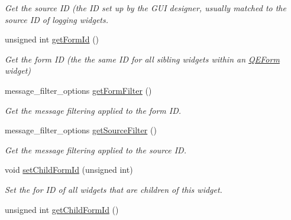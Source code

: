 \begin{DoxyCompactItemize}
\begin{DoxyCompactList}\small\item\em Get the source ID (the ID set up by the GUI designer, usually matched to the source ID of logging widgets. \end{DoxyCompactList}\item 
\hypertarget{classUserMessage_a086c3d5af3d5b442684a0a099b9f1126}{
unsigned int \hyperlink{classUserMessage_a086c3d5af3d5b442684a0a099b9f1126}{getFormId} ()}
\label{classUserMessage_a086c3d5af3d5b442684a0a099b9f1126}

\begin{DoxyCompactList}\small\item\em Get the form ID (the the same ID for all sibling widgets within an \hyperlink{classQEForm}{QEForm} widget) \end{DoxyCompactList}\item 
\hypertarget{classUserMessage_a342c763a4cb31a8f5d9597655b25f7a3}{
message\_\-filter\_\-options \hyperlink{classUserMessage_a342c763a4cb31a8f5d9597655b25f7a3}{getFormFilter} ()}
\label{classUserMessage_a342c763a4cb31a8f5d9597655b25f7a3}

\begin{DoxyCompactList}\small\item\em Get the message filtering applied to the form ID. \end{DoxyCompactList}\item 
\hypertarget{classUserMessage_a51393a98df511d7ad6ca594ce95ceec9}{
message\_\-filter\_\-options \hyperlink{classUserMessage_a51393a98df511d7ad6ca594ce95ceec9}{getSourceFilter} ()}
\label{classUserMessage_a51393a98df511d7ad6ca594ce95ceec9}

\begin{DoxyCompactList}\small\item\em Get the message filtering applied to the source ID. \end{DoxyCompactList}\item 
\hypertarget{classUserMessage_aacfecaf9cfe2ad513c0b784e433c1a5d}{
void \hyperlink{classUserMessage_aacfecaf9cfe2ad513c0b784e433c1a5d}{setChildFormId} (unsigned int)}
\label{classUserMessage_aacfecaf9cfe2ad513c0b784e433c1a5d}

\begin{DoxyCompactList}\small\item\em Set the for ID of all widgets that are children of this widget. \end{DoxyCompactList}\item 
\hypertarget{classUserMessage_a1ed8ce29ef209c991bf7fe6872b787fc}{
unsigned int \hyperlink{classUserMessage_a1ed8ce29ef209c991bf7fe6872b787fc}{getChildFormId} ()}
\label{classUserMessage_a1ed8ce29ef209c991bf7fe6872b787fc}


\end{DoxyCompactItemize}

